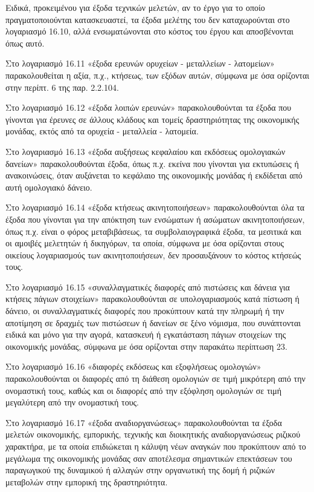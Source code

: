 \documentclass[A4,10pt,greek]{book}
\begin{document}
\begin{enumerate}
Ειδικά, προκειμένου για έξοδα τεχνικών μελετών, αν το έργο για το οποίο πραγματοποιούνται κατασκευαστεί, τα έξοδα μελέτης του δεν καταχωρούνται στο λογαριασμό 16.10, αλλά ενσωματώνονται στο κόστος του έργου και αποσβένονται όπως αυτό.

Στο λογαριασμό 16.11 «έξοδα ερευνών ορυχείων - μεταλλείων - λατομείων» παρακολουθείται η αξία, π.χ., κτήσεως, των εξόδων αυτών, σύμφωνα με όσα ορίζονται στην περίπτ. 6 της παρ. 2.2.104.

Στο λογαριασμό 16.12 «έξοδα λοιπών ερευνών» παρακολουθούνται τα έξοδα που γίνονται για έρευνες σε άλλους κλάδους και τομείς δραστηριότητας της οικονομικής μονάδας, εκτός από τα ορυχεία - μεταλλεία - λατομεία.

Στο λογαριασμό 16.13 «έξοδα αυξήσεως κεφαλαίου και εκδόσεως ομολογιακών δανείων» παρακολουθούνται έξοδα, όπως π.χ. εκείνα που γίνονται για εκτυπώσεις ή ανακοινώσεις, όταν αυξάνεται το κεφάλαιο της οικονομικής μονάδας ή εκδίδεται από αυτή ομολογιακό δάνειο.

Στο λογαριασμό 16.14 «έξοδα κτήσεως ακινητοποιήσεων» παρακολουθούνται όλα τα έξοδα που γίνονται για την απόκτηση των ενσώματων ή ασώματων ακινητοποιήσεων, όπως π.χ. είναι ο φόρος μεταβιβάσεως, τα συμβολαιογραφικά έξοδα, τα μεσιτικά και οι αμοιβές μελετητών ή δικηγόρων, τα οποία, σύμφωνα με όσα ορίζονται στους οικείους λογαριασμούς των ακινητοποιήσεων, δεν προσαυξάνουν το κόστος κτήσεώς τους.

Στο λογαριασμό 16.15 «συναλλαγματικές διαφορές από πιστώσεις και δάνεια για κτήσεις πάγιων στοιχείων» παρακολουθούνται σε υπολογαριασμούς κατά πίστωση ή δάνειο, οι συναλλαγματικές διαφορές που προκύπτουν κατά την πληρωμή ή την αποτίμηση σε δραχμές των πιστώσεων ή δανείων σε ξένο νόμισμα, που συνάπτονται ειδικά και μόνο για την αγορά, κατασκευή ή εγκατάσταση πάγιων στοιχείων της οικονομικής μονάδας, σύμφωνα με όσα ορίζονται στην παρακάτω περίπτωση 23.

Στο λογαριασμό 16.16 «διαφορές εκδόσεως και εξοφλήσεως ομολογιών» παρακολουθούνται οι διαφορές από τη διάθεση ομολογιών σε τιμή μικρότερη από την ονομαστική τους, καθώς και οι διαφορές από την εξόφληση ομολογιών σε τιμή μεγαλύτερη από την ονομαστική τους.

Στο λογαριασμό 16.17 «έξοδα αναδιοργανώσεως» παρακολουθούνται τα έξοδα μελετών οικονομικής, εμπορικής, τεχνικής και διοικητικής αναδιοργανώσεως ριζικού χαρακτήρα, με τα οποία επιδιώκεται η κάλυψη νέων αναγκών που προκύπτουν από το μεγάλωμα της οικονομικής μονάδας σαν αποτέλεσμα σημαντικών επεκτάσεων του παραγωγικού της δυναμικού ή αλλαγών στην οργανωτική της δομή ή ριζικών μεταβολών στην εμπορική της δραστηριότητα.


\end{enumerate}
\end{document}
